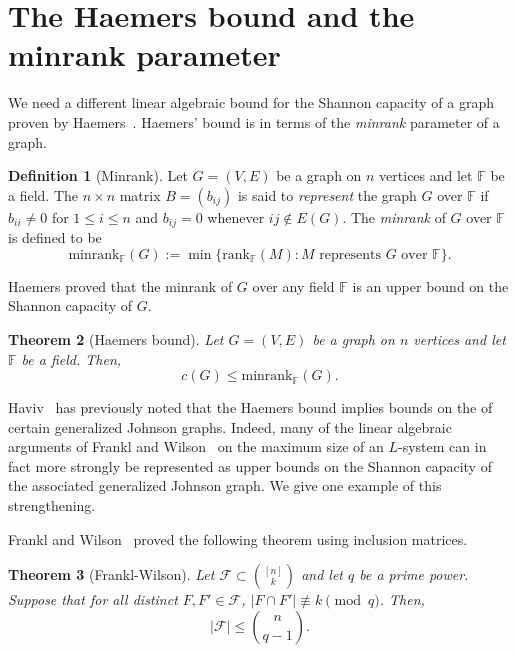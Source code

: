 \documentclass[11pt]{article}
\newtheorem{theorem}{Theorem}[section]
\theoremstyle{definition}
\newtheorem{definition}[theorem]{Definition}
\theoremstyle{remark}
\newcommand{\cF}{\mathcal{F}}
\begin{document}
\section{The Haemers bound and the minrank parameter}

We need a different linear algebraic bound for the Shannon capacity of a graph proven by Haemers~\cite{Haem1978, Haem1979}. Haemers' bound is in terms of the \textit{minrank} parameter of a graph. 

\begin{definition}[Minrank]\label{defn:minrank}
Let $G = (V, E)$ be a graph on $n$ vertices and let $\mathbb{F}$ be a field. The $n\times{n}$ matrix $B=(b_{ij})$ is said to \textit{represent} the graph $G$ over $\mathbb{F}$ if $b_{ii} \neq 0$ for $1\le i \le n$ and $b_{ij} = 0$ whenever $ij \notin E(G)$. The \textit{minrank} of $G$ over $\mathbb{F}$ is defined to be 
\[\text{minrank}_{\mathbb{F}}(G) := \min\{\text{rank}_{\mathbb{F}}(M): M \text{ represents } G \text{ over } \mathbb{F}\}.\]
\end{definition}

Haemers proved that the minrank of $G$ over any field $\mathbb{F}$ is an upper bound on the Shannon capacity of $G$. 

\begin{theorem}[Haemers bound]\label{thm:haembd}
Let $G = (V, E)$ be a graph on $n$ vertices and let $\mathbb{F}$ be a field. Then, 
\[c(G) \le \text{minrank}_{\mathbb{F}}(G).\]
\end{theorem}



Haviv~\cite{Haviv} has previously noted that the Haemers bound implies bounds on the  of certain generalized Johnson graphs. Indeed, many of the linear algebraic arguments of Frankl and Wilson~\cite{FW1981} on the maximum size of an $L$-system can in fact more strongly be represented as upper bounds on the Shannon capacity of the associated generalized Johnson graph. We give one example of this strengthening. 

Frankl and Wilson~\cite{FW1981} proved the following theorem using inclusion matrices. 

\begin{theorem}[Frankl-Wilson]\label{FWthm}
Let $\cF \subset \binom{[n]}{k}$ and let $q$ be a prime power. Suppose that for all distinct $F, F'\in \cF$,  $|F \cap F'| \not\equiv k\pmod{q}$. Then, 
\[|\cF| \le \binom{n}{q-1}.\]
\end{theorem}
\end{document}
